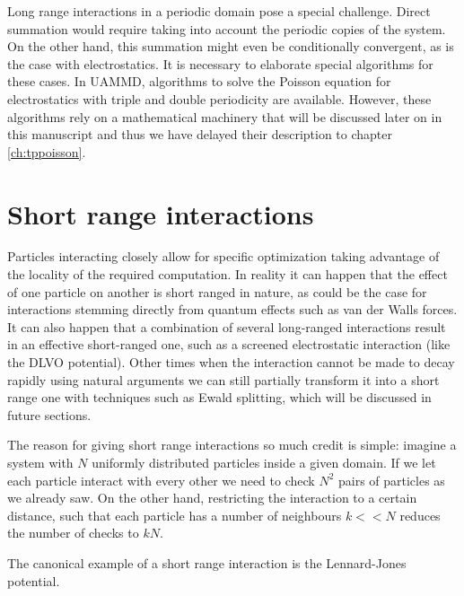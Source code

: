 \documentclass[ twoside,openright,titlepage,numbers=noenddot,%
headinclude,footinclude,cleardoublepage=empty,abstract=on,
BCOR=5mm,paper=b5,fontsize=11pt, dvipsnames
]{scrreprt}
\newcommand{\uammd}{\gls{UAMMD}\xspace}
\begin{document}
Long range interactions in a periodic domain pose a special challenge. Direct summation would require taking into account the periodic copies of the system. On the other hand, this summation might even be conditionally convergent, as is the case with electrostatics. It is necessary to elaborate special algorithms for these cases. In \uammd, algorithms to solve the Poisson equation for electrostatics with triple and double periodicity are available. However, these algorithms rely on a mathematical machinery that will be discussed later on in this manuscript and thus we have delayed their description to chapter \ref{ch:tppoisson}.



\chapter{Short range interactions}\label{sec:shortrange}
Particles interacting closely allow for specific optimization taking advantage of the locality of the required computation.
In reality it can happen that the effect of one particle on another is short ranged in nature, as could be the case for interactions stemming directly from quantum effects such as van der Walls forces. It can also happen that a combination of several long-ranged interactions result in an effective short-ranged one, such as a screened electrostatic interaction (like the DLVO potential). Other times when the interaction cannot be made to decay rapidly using natural arguments we can still partially transform it into a short range one with techniques such as Ewald splitting, which will be discussed in future sections.

The reason for giving short range interactions so much credit is simple: imagine a system with $N$ uniformly distributed particles inside a given domain. If we let each particle interact with every other we need to check $N^2$ pairs of particles as we already saw. On the other hand, restricting the interaction to a certain distance, such that each particle has a number of neighbours $k<<N$ reduces the number of checks to $kN$.

The canonical example of a short range interaction is the Lennard-Jones potential.
\end{document}
